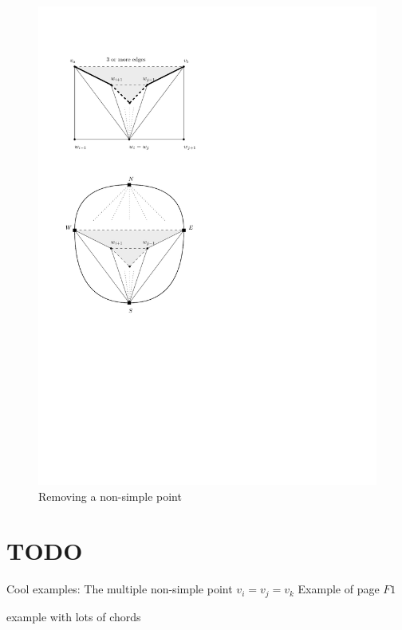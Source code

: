 \begin{figure}[h!]
\centering
\includegraphics[scale=1]{img/removeNonSimplePoint}

\caption{Removing a non-simple point 
    \label{fig:removeNonSimplePoint}}
\end{figure}


\section{TODO}
Cool examples: The multiple non-simple point $v_i = v_j =v_k$
Example of page $F1$

example with lots of chords
